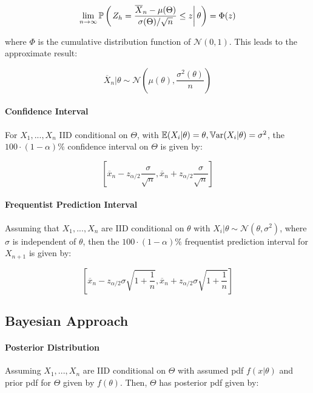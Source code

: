 \documentclass[a4paper]{article}
\begin{document}
                \[
                    \lim_{n \to \infty} \mathbb{P}\left(\left.Z_h = \frac{\overline
                    X_n - \mu(\Theta)}{\sigma(\Theta)/\sqrt{n}} \leq z \right|
                    \theta\right) = \Phi(z)
                \]

                where $\Phi$ is the cumulative distribution function of
                $\mathcal{N}(0, 1)$. This leads to the approximate result:

                \[
                    \overline X_n | \theta \sim \mathcal{N}\left(\mu(\theta),
                    \frac{\sigma^2(\theta)}{n}\right)
                \]

            \paragraph{Confidence Interval}
                For $X_1, ..., X_n$ IID conditional on $\Theta$, with $\mathbb{E}(X_i |
                \theta) = \theta, \mathbb{V}\text{ar}(X_i | \theta) = \sigma^2$, the $100 \cdot
                (1 - \alpha)\%$ confidence interval on $\Theta$ is given by:

                \[
                    \left[\overline x_n - z_{\alpha/2}\frac{\sigma}{\sqrt{n}},
                    \overline x_n + z_{\alpha/2} \frac{\sigma}{\sqrt{n}}\right]
                \]

            \paragraph{Frequentist Prediction Interval}
                Assuming that $X_1, ..., X_n$ are IID conditional on $\theta$
                with $X_i | \theta \sim \mathcal{N}(\theta, \sigma^2)$, where
                $\sigma$ is independent of $\theta$, then the $100 \cdot (1 -
                \alpha)\%$ frequentist prediction interval for $X_{n+1}$ is
                given by:

                \[
                    \left[\overline x_n - z_{\alpha/2} \sigma \sqrt{1 +
                    \frac{1}{n}}, \overline x_n + z_{\alpha/2} \sigma \sqrt{1 +
                    \frac{1}{n}}\right]
                \]

        \subsection*{Bayesian Approach}
            \paragraph{Posterior Distribution}
                Assuming $X_1, ..., X_n$ are IID conditional on $\Theta$ with
                assumed pdf $f(x | \theta)$ and prior pdf for $\Theta$ given by
                $f(\theta)$. Then, $\Theta$ has posterior pdf given by:
\end{document}
